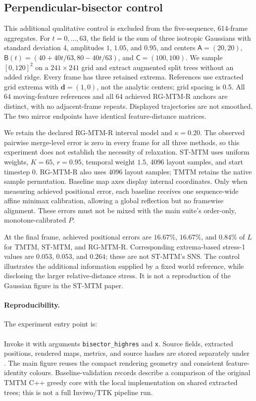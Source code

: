 \subsection{Perpendicular-bisector control}\label{sec:bisector_protocol}
This additional qualitative control is excluded from the five-sequence, 614-frame aggregates. For $t=0,\ldots,63$, the field is the sum of three isotropic Gaussians with standard deviation 4, amplitudes $1$, $1.05$, and $0.95$, and centers $\mathsf A=(20,20)$, $\mathsf B(t)=(40+40t/63,80-40t/63)$, and $\mathsf C=(100,100)$. We sample $[0,120]^2$ on a $241\times241$ grid and extract augmented split trees without an added ridge. Every frame has three retained extrema. References use extracted grid extrema with $\mathbf d=(1,0)$, not the analytic centers; grid spacing is 0.5. All 64 moving-feature references and all 64 achieved RG-MTM-R anchors are distinct, with no adjacent-frame repeats. Displayed trajectories are not smoothed. The two mirror endpoints have identical feature-distance matrices.

We retain the declared RG-MTM-R interval model and $\kappa=0.20$. The observed pairwise merge-level error is zero in every frame for all three methods, so this experiment does not establish the necessity of relaxation. ST-MTM uses uniform weights, $K=65$, $r=0.95$, temporal weight $1.5$, 4096 layout samples, and start timestep 0. RG-MTM-R also uses 4096 layout samples; TMTM retains the native sample permutation. Baseline map axes display internal coordinates. Only when measuring achieved positional error, each baseline receives one sequence-wide affine minimax calibration, allowing a global reflection but no framewise alignment. These errors must not be mixed with the main suite's order-only, monotone-calibrated $P$.

At the final frame, achieved positional errors are $16.67\%$, $16.67\%$, and $0.84\%$ of $L$ for TMTM, ST-MTM, and RG-MTM-R. Corresponding extrema-based stress-1 values are $0.053$, $0.053$, and $0.264$; these are not ST-MTM's SNS. The control illustrates the additional information supplied by a fixed world reference, while disclosing the larger relative-distance stress. It is not a reproduction of the Gaussian figure in the ST-MTM paper.

\paragraph{Reproducibility.}
The experiment entry point is:\\
\\
Invoke it with arguments \texttt{bisector\_highres} and \texttt{x}. Source fields, extracted positions, rendered maps, metrics, and source hashes are stored separately under . The main figure reuses the compact rendering geometry and consistent feature-identity colours. Baseline-validation records describe a comparison of the original TMTM C++ greedy core with the local implementation on shared extracted trees; this is not a full Inviwo/TTK pipeline run.
